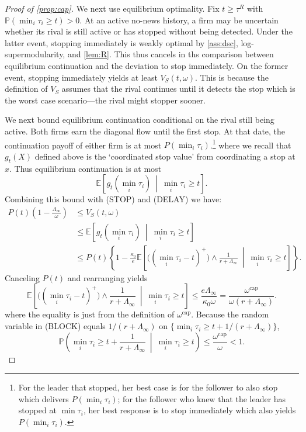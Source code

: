 \documentclass[12pt,reqno]{article}
\newcommand{\Ex}{\mathbb{E}}
\renewcommand{\Pr}{\mathbb{P}}
\theoremstyle{definition} \newtheorem{example}{Example}
\theoremstyle{definition} \newtheorem{condition}{Condition}
\theoremstyle{definition} \newtheorem{corollary}{Corollary}
\theoremstyle{definition} \newtheorem{claim}{Claim}
\theoremstyle{definition} \newtheorem{definition}{Definition}
\theoremstyle{definition} \newtheorem{conjecture}{Conjecture}
\theoremstyle{definition} \newtheorem{Lemma}{Lemma}
\theoremstyle{definition} \newtheorem{lemma}{Lemma}
\theoremstyle{plain} \newtheorem{theorem}{Theorem}
\theoremstyle{definition} \newtheorem{assumption}{Assumption}
\theoremstyle{definition} \newtheorem*{assumptionnonumber}{Assumption}
\theoremstyle{definition} \newtheorem*{theoremNoNumber}{Proposition}
\theoremstyle{definition}
\theoremstyle{definition}\newtheorem{proposition}{Proposition}
\theoremstyle{definition} \newtheorem{result}{Result}
\theoremstyle{definition} \newtheorem*{definitionNoNumber}{Definition}
\theoremstyle{definition} \newtheorem{Definition}{Definition}
\theoremstyle{definition} \newtheorem*{DefinitionNoNumber}{Definition}
\theoremstyle{definition} \newtheorem*{fact}{Fact}
\theoremstyle{definition} \newtheorem*{property}{Property}
\theoremstyle{definition} \newtheorem{remark}{Remark}
\begin{document}
\begin{proof}[Proof of \cref{prop:cap}]
We next use equilibrium optimality. Fix $t\geq\tau^R$ with
$\Pr(\min_i\tau_i\geq t)>0$. At an active no-news history, a firm may be uncertain
whether its rival is still active or has stopped without being detected. Under the latter event, stopping immediately is weakly optimal by
\cref{ass:dsc}, log-supermodularity, and \cref{lem:R}. This thus cancels in ths comparison between equilibrium continuation and the deviation to stop immediately. On the former event, stopping immediately yields at
least $V_S(t,\omega)$. This is because the  definition of $V_S$ assumes that the rival continues until it detects the stop which is the worst case scenario---the rival might stopper sooner. 

We next bound equilibrium continuation conditional on the rival still being
active. Both firms earn the diagonal flow until the first stop. At that date,
the continuation payoff of either firm is at most
$P(\min_i\tau_i)$.\footnote{For the leader that stopped, her best case is for the follower to also stop which delivers $P(\min_i \tau_i)$; for the follower who knew that the leader has stopped at $\min \tau_i$, her best response is to stop immediately which also yields $P(\min_i \tau_i)$.} 
where we recall that $g_t(X)$ defined above is the `coordinated stop value' from coordinating a stop at $x$. Thus equilibrium continuation is at most
\[
\Ex\!\left[
g_t(\min_i\tau_i)
\ \middle|\
\min_i\tau_i\geq t
\right].
\]
Combining this bound with 
\textup{(STOP)} and
\textup{(DELAY)} we have: 
\begin{align*}
P(t)\left(1-\frac{\Lambda_\infty}{\omega}\right)
&\leq V_S(t,\omega)\\
&\leq
\Ex\!\left[
g_t(\min_i\tau_i)
\ \middle|\
\min_i\tau_i\geq t
\right]\\
&\leq
P(t)\left\{
1-\frac{\kappa_0}{e}
\Ex\left[
\big((\min_i\tau_i-t)^+\big)
\wedge\frac1{r+\Lambda_\infty}
\ \middle|\
\min_i\tau_i\geq t
\right]
\right\}.
\end{align*}
Canceling $P(t)$ and rearranging yields
\[
\Ex\left[
\big((\min_i\tau_i-t)^+\big)
\wedge\frac1{r+\Lambda_\infty}
\ \middle|\
\min_i\tau_i\geq t
\right]
\leq
\frac{e\Lambda_\infty}{\kappa_0\omega} = \frac{\omega^{\mathrm{cap}}}
{\omega(r+\Lambda_\infty)}.
\tag{BLOCK}
\]
where the equality is just from the definition of $\omega^{\mathrm{cap}}$. Because the random variable in \textup{(BLOCK)} equals
$1/(r+\Lambda_\infty)$ on
$\{\min_i\tau_i\geq t+1/(r+\Lambda_\infty)\}$,
\[
\Pr\left(
\min_i\tau_i\geq t+\frac1{r+\Lambda_\infty}
\ \middle|\
\min_i\tau_i\geq t
\right)
\leq \frac{\omega^{\mathrm{cap}}}{\omega}<1.
\]
\end{proof}
\end{document}
